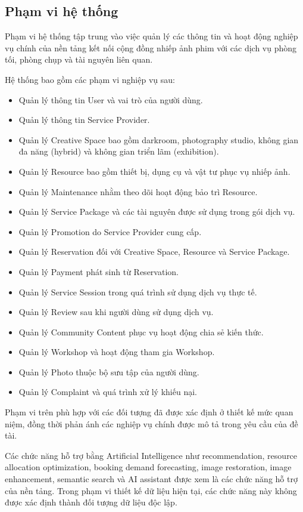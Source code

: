\subsection{Phạm vi hệ thống}

Phạm vi hệ thống tập trung vào việc quản lý các thông tin và hoạt động nghiệp vụ chính của nền tảng kết nối cộng đồng nhiếp ảnh phim với các dịch vụ phòng tối, phòng chụp và tài nguyên liên quan.

Hệ thống bao gồm các phạm vi nghiệp vụ sau:

\begin{itemize}
	\item Quản lý thông tin User và vai trò của người dùng.
	\item Quản lý thông tin Service Provider.
	\item Quản lý Creative Space bao gồm darkroom, photography studio, không gian đa năng (hybrid) và không gian triển lãm (exhibition).
	\item Quản lý Resource bao gồm thiết bị, dụng cụ và vật tư phục vụ nhiếp ảnh.
	\item Quản lý Maintenance nhằm theo dõi hoạt động bảo trì Resource.
	\item Quản lý Service Package và các tài nguyên được sử dụng trong gói dịch vụ.
	\item Quản lý Promotion do Service Provider cung cấp.
	\item Quản lý Reservation đối với Creative Space, Resource và Service Package.
	\item Quản lý Payment phát sinh từ Reservation.
	\item Quản lý Service Session trong quá trình sử dụng dịch vụ thực tế.
	\item Quản lý Review sau khi người dùng sử dụng dịch vụ.
	\item Quản lý Community Content phục vụ hoạt động chia sẻ kiến thức.
	\item Quản lý Workshop và hoạt động tham gia Workshop.
	\item Quản lý Photo thuộc bộ sưu tập của người dùng.
	\item Quản lý Complaint và quá trình xử lý khiếu nại.
\end{itemize}

Phạm vi trên phù hợp với các đối tượng đã được xác định ở thiết kế mức quan niệm, đồng thời phản ánh các nghiệp vụ chính được mô tả trong yêu cầu của đề tài.

Các chức năng hỗ trợ bằng Artificial Intelligence như recommendation, resource allocation optimization, booking demand forecasting, image restoration, image enhancement, semantic search và AI assistant được xem là các chức năng hỗ trợ của nền tảng. Trong phạm vi thiết kế dữ liệu hiện tại, các chức năng này không được xác định thành đối tượng dữ liệu độc lập.

